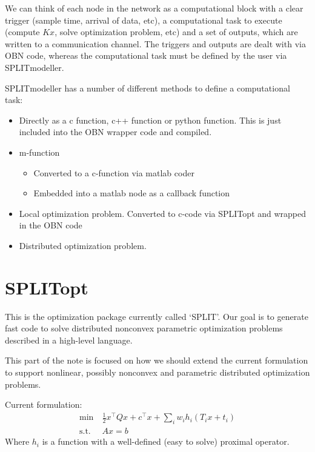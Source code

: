 \documentclass[11pt,a4paper]{article}
\newcommand{\tp}{\top}
\begin{document}
We can think of each node in the network as a computational block with a clear trigger (sample time, arrival of data, etc), a computational task to execute (compute $Kx$, solve optimization problem, etc) and a set of outputs, which are written to a communication channel. The triggers and outputs are dealt with via OBN code, whereas the computational task must be defined by the user via SPLITmodeller.

SPLITmodeller has a number of different methods to define a computational task:
\begin{itemize}
  \item Directly as a c function, c++ function or python function. This is just included into the OBN wrapper code and compiled.
  \item m-function
  \begin{itemize}
    \item Converted to a c-function via matlab coder
    \item Embedded into a matlab node as a callback function
  \end{itemize}
  \item Local optimization problem. Converted to c-code via SPLITopt and wrapped in the OBN code
  \item Distributed optimization problem. 
\end{itemize}



\newpage
\section*{SPLITopt}
This is the optimization package currently called `SPLIT'. Our goal is to generate fast code to solve distributed nonconvex parametric optimization problems described in a high-level language.

This part of the note is focused on how we should extend the current formulation to support nonlinear, possibly nonconvex and parametric distributed optimization problems.

Current formulation:
\begin{align*}
  \min\ &\frac{1}{2}x^\tp Qx + c^\tp x + \sum_i w_i h_i(T_ix + t_i)\\
  \text{s.t.}\ & Ax = b
\end{align*}
Where $h_i$ is a function with a well-defined (easy to solve) proximal operator.
\end{document}
